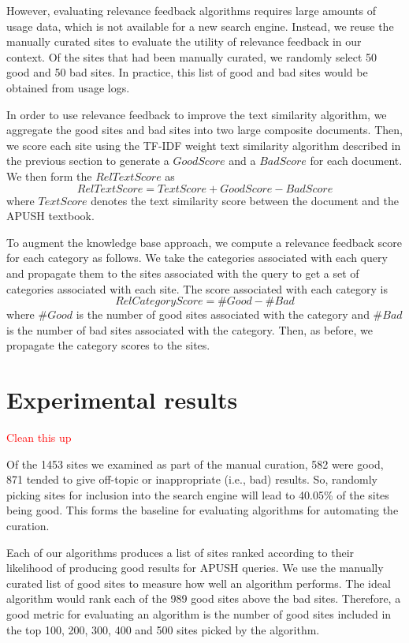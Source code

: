 \documentclass[pdfpagelabels=false,plainpages=true]{acm_proc_article-sp}
\begin{document}
However, evaluating relevance feedback algorithms requires large amounts of
usage data, which is not available for a new search engine. Instead, we 
reuse the manually curated sites to evaluate the utility of relevance feedback
in our context. Of the sites that had been manually curated, we randomly
select 50 good and 50 bad sites. In practice, this list of good and bad
sites would be obtained from usage logs. 

In order to use relevance feedback to improve the text similarity algorithm, we
aggregate the good sites and bad sites into two large composite documents. Then,
we score each site using the TF-IDF weight text similarity algorithm described
in the previous section to generate a $GoodScore$ and a $BadScore$ for each
document. We then form the $RelTextScore$ as 
\begin{equation}
RelTextScore = TextScore + GoodScore - BadScore
\end{equation}
where $TextScore$ denotes the text similarity score between the document and
the APUSH textbook.

To augment the knowledge base approach, we compute a relevance feedback score
for each category as follows. We take the categories associated with each query 
and propagate them to the sites associated with the query to get
a set of categories associated with each site. The score associated with each
category is 
\begin{equation}
RelCategoryScore = \#Good - \#Bad
\end{equation}
where $\#Good$ is the number of good sites associated with the category and $\#Bad$ is
the number of bad sites associated with the category. Then, as before, we
propagate the category scores to the sites.   

\section{Experimental results}

\textcolor{red}{Clean this up}



Of the 1453 sites we examined as part of the manual curation, 582 were good, 871
tended to give off-topic or inappropriate (i.e., bad) results. So, randomly
picking sites for inclusion into the search engine will lead to 40.05\% of the
sites being good. This forms the baseline for evaluating algorithms for
automating the curation. 

Each of our algorithms produces a list of sites ranked according to their
likelihood of producing good results for APUSH queries. We use the manually
curated list of good sites to measure how well an algorithm performs. The ideal
algorithm would rank each of the 989 good sites above the bad sites. Therefore,
a good metric for evaluating an algorithm is the number of good sites included
in the top 100, 200, 300, 400 and 500 sites picked by the algorithm. 
\end{document}
